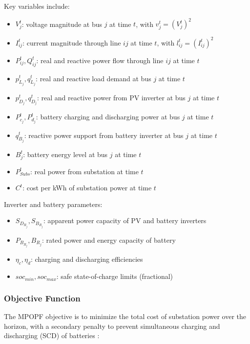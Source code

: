 Key variables include:
\begin{itemize}
    \item \(V_j^t\): voltage magnitude at bus \(j\) at time \(t\), with \(v_j^t = (V_j^t)^2\)
    \item \(I_{ij}^t\): current magnitude through line \(ij\) at time \(t\), with \(l_{ij}^t = (I_{ij}^t)^2\)
    \item \(P_{ij}^t, Q_{ij}^t\): real and reactive power flow through line \(ij\) at time \(t\)
    \item \(p^t_{L_j}, q^t_{L_j}\): real and reactive load demand at bus \(j\) at time \(t\)
    \item \(p^t_{D_j}, q^t_{D_j}\): real and reactive power from PV inverter at bus \(j\) at time \(t\)
    \item \(P_{c_j}^t, P_{d_j}^t\): battery charging and discharging power at bus \(j\) at time \(t\)
    \item \(q_{B_j}^t\): reactive power support from battery inverter at bus \(j\) at time \(t\)
    \item \(B_j^t\): battery energy level at bus \(j\) at time \(t\)
    \item \(P^t_{Subs}\): real power from substation at time \(t\)
    \item \(C^t\): cost per kWh of substation power at time \(t\)
\end{itemize}

Inverter and battery parameters:
\begin{itemize}
    \item \(S_{D_{R_j}}, S_{B_{R_j}}\): apparent power capacity of PV and battery inverters
    \item \(P_{B_{R_j}}, B_{R_j}\): rated power and energy capacity of battery
    \item \(\eta_c, \eta_d\): charging and discharging efficiencies
    \item \(soc_{min}, soc_{max}\): safe state-of-charge limits (fractional)
\end{itemize}

\subsubsection{Objective Function}

The MPOPF objective is to minimize the total cost of substation power over the horizon, with a secondary penalty to prevent simultaneous charging and discharging (SCD) of batteries \cite{Nazir2021Sep}:

